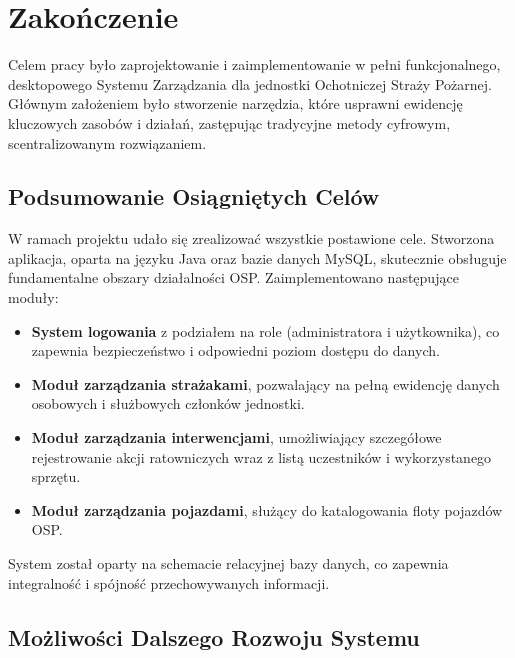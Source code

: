 \chapter{Zakończenie}
\label{chap:zakonczenie}

Celem pracy było zaprojektowanie i zaimplementowanie w pełni funkcjonalnego, desktopowego Systemu Zarządzania dla jednostki Ochotniczej Straży Pożarnej. Głównym założeniem było stworzenie narzędzia, które usprawni ewidencję kluczowych zasobów i działań, zastępując tradycyjne metody cyfrowym, scentralizowanym rozwiązaniem.

\section{Podsumowanie Osiągniętych Celów}
\label{sec:podsumowanie_celow}

W ramach projektu udało się zrealizować wszystkie postawione cele. Stworzona aplikacja, oparta na języku Java oraz bazie danych MySQL, skutecznie obsługuje fundamentalne obszary działalności OSP. Zaimplementowano następujące moduły:
\begin{itemize}
    \item \textbf{System logowania} z podziałem na role (administratora i użytkownika), co zapewnia bezpieczeństwo i odpowiedni poziom dostępu do danych.
    \item \textbf{Moduł zarządzania strażakami}, pozwalający na pełną ewidencję danych osobowych i służbowych członków jednostki.
    \item \textbf{Moduł zarządzania interwencjami}, umożliwiający szczegółowe rejestrowanie akcji ratowniczych wraz z listą uczestników i wykorzystanego sprzętu.
    \item \textbf{Moduł zarządzania pojazdami}, służący do katalogowania floty pojazdów OSP.
\end{itemize}
System został oparty na schemacie relacyjnej bazy danych, co zapewnia integralność i spójność przechowywanych informacji.

\section{Możliwości Dalszego Rozwoju Systemu}
\label{sec:dalszy_rozwoj}

